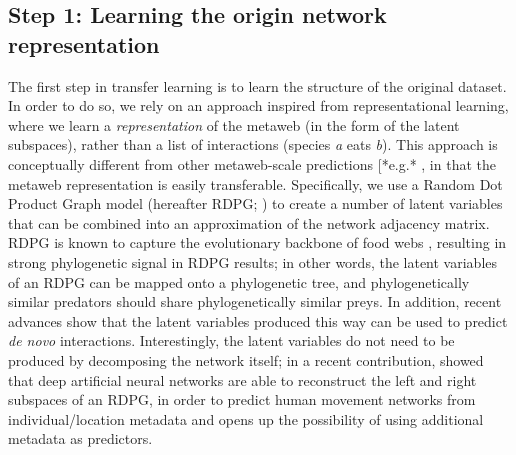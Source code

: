 \subsection{Step 1: Learning the origin network
representation}\label{step-1-learning-the-origin-network-representation}

The first step in transfer learning is to learn the structure of the
original dataset. In order to do so, we rely on an approach inspired
from representational learning, where we learn a \emph{representation}
of the metaweb (in the form of the latent subspaces), rather than a list
of interactions (species \emph{a} eats \emph{b}). This approach is
conceptually different from other metaweb-scale predictions {[}*e.g.*
\cite{Albouy2019MarFis}, in that the metaweb representation is easily
transferable. Specifically, we use a Random Dot Product Graph model
(hereafter RDPG; \cite{Young2007RanDot}) to create a number of latent
variables that can be combined into an approximation of the network
adjacency matrix. RDPG is known to capture the evolutionary backbone of
food webs \cite{DallaRiva2016ExpEvo}, resulting in strong phylogenetic
signal in RDPG results; in other words, the latent variables of an RDPG
can be mapped onto a phylogenetic tree, and phylogenetically similar
predators should share phylogenetically similar preys. In addition,
recent advances show that the latent variables produced this way can be
used to predict \emph{de novo} interactions. Interestingly, the latent
variables do not need to be produced by decomposing the network itself;
in a recent contribution, \cite{Runghen2021ExpNod} showed that deep artificial
neural networks are able to reconstruct the left and right subspaces of
an RDPG, in order to predict human movement networks from
individual/location metadata and opens up the possibility of using
additional metadata as predictors.

